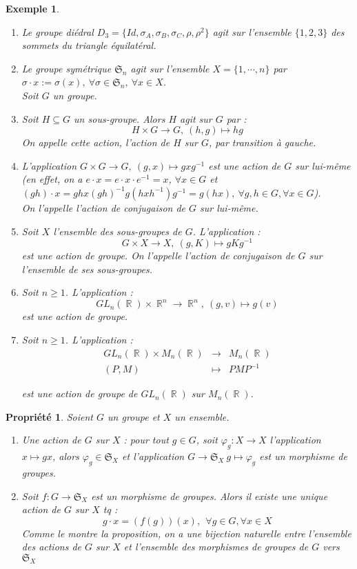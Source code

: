 \documentclass[a4paper, oneside]{report}
\theoremstyle{break}
\newtheorem{propr}[thm]{Propriété}
\newtheorem{exem}[thm]{Exemple}
\newcommand{\x}{\times}
\DeclareMathOperator{\R}{\mathbb{R}}
\renewcommand{\S}{\mathfrak{S}}
\begin{document}
\begin{exem}
	\begin{enumerate}
		\item Le groupe diédral $D_3=\{Id, \sigma_A, \sigma_B, \sigma_C, \rho, \rho^2\}$ agit sur l'ensemble $\{1,2,3\}$ des sommets du triangle équilatéral.
		\item Le groupe symétrique $\S_n$ agit sur l'ensemble $X=\{1,\cdots,n\}$ par $\sigma \cdot x := \sigma(x), ~\forall \sigma \in \S_n,~\forall x\in X$.\\
		
		Soit $G$ un groupe.
		\item Soit $H\subseteq G$ un sous-groupe. Alors $H$ agit sur $G$ par :
		$$H\x G \rightarrow G,~ (h,g)\mapsto hg$$
		On appelle cette action, l'action de $H$ sur $G$, par transition à gauche.
		\item L'application $G\x G \rightarrow G,~ (g,x) \mapsto gxg^{-1}$ est une action de $G$ sur lui-même (en effet, on a $e \cdot x = e \cdot x \cdot e^{-1} = x$, $\forall x\in G$ et $(gh) \cdot x=ghx(gh)^{-1}g(hxh^{-1})g^{-1}=g(hx),~\forall g,h\in G, \forall x\in G$).\\
		On l'appelle l'action de conjugaison de $G$ sur lui-même.
		\item Soit $X$ l'ensemble des sous-groupes de $G$. L'application :
		$$G\x X \rightarrow X,~(g,K)\mapsto gKg^{-1}$$
		est une action de groupe. On l'appelle l'action de conjugaison de $G$ sur l'ensemble de ses sous-groupes.
		\item Soit $n\geq 1$. L'application :
		$$GL_n(\R)\x \R^n \rightarrow \R^n,~(g,v)\mapsto g(v)$$
		est une action de groupe.
		\item Soit $n\geq 1$. L'application :
		$$\begin{array}{lll}
		GL_n(\R)\x M_n(\R)&\rightarrow & M_n(\R)\\
		(P,M)&\mapsto & PMP^{-1}
		\end{array}$$
		
		est une action de groupe de $GL_n(\R)$ sur $M_n(\R)$.
	\end{enumerate}
\end{exem}

\begin{propr}
	Soient $G$ un groupe et $X$ un ensemble.
	\begin{enumerate}
		\item Une action de $G$ sur $X$ : pour tout $g\in G$, soit $\varphi_g :X \rightarrow X$ l'application $x\mapsto gx$, alors $\varphi_g \in \S_X$ et l'application $G\rightarrow \S_X~g\mapsto \varphi_g$ est un morphisme de groupes.
		\item Soit $f:G\rightarrow \S_X$ est un morphisme de groupes. Alors il existe une unique action de $G$ sur $X$ tq :
		$$g \cdot x = (f(g))(x),~~\forall g\in G,\forall x\in X$$
		Comme le montre la proposition, on a une bijection naturelle entre l'ensemble des actions de $G$ sur $X$ et l'ensemble des morphismes de groupes de $G$ vers $\S_X$
	\end{enumerate}
\end{propr}
\end{document}
